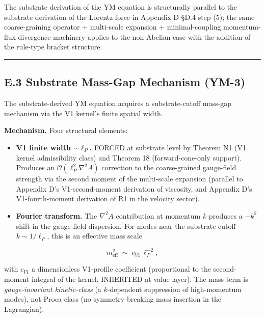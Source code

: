 \documentclass[
  11pt,a4paper]{article}
\providecommand{\tightlist}{%
  \setlength{\itemsep}{0pt}\setlength{\parskip}{0pt}}
\begin{document}
The substrate derivation of the YM equation is structurally parallel to
the substrate derivation of the Lorentz force in Appendix D §D.4 step
(5); the same coarse-graining operator + multi-scale expansion +
minimal-coupling momentum-flux divergence machinery applies to the
non-Abelian case with the addition of the rule-type bracket structure.

\begin{center}\rule{0.5\linewidth}{0.5pt}\end{center}

\subsection{E.3 Substrate Mass-Gap Mechanism
(YM-3)}\label{e.3-substrate-mass-gap-mechanism-ym-3}

The substrate-derived YM equation acquires a substrate-cutoff mass-gap
mechanism via the V1 kernel's finite spatial width.

\textbf{Mechanism.} Four structural elements:

\begin{itemize}
\tightlist
\item
  \textbf{V1 finite width \(\sim \ell_P\).} FORCED at substrate level by
  Theorem N1 (V1 kernel admissibility class) and Theorem 18
  (forward-cone-only support). Produces an
  \(\mathcal{O}(\ell_P^2\nabla^2 A)\) correction to the coarse-grained
  gauge-field strength via the second moment of the multi-scale
  expansion (parallel to Appendix D's V1-second-moment derivation of
  viscosity, and Appendix D's V1-fourth-moment derivation of R1 in the
  velocity sector).
\item
  \textbf{Fourier transform.} The \(\nabla^2 A\) contribution at
  momentum \(k\) produces a \(-k^2\) shift in the gauge-field
  dispersion. For modes near the substrate cutoff \(k \sim 1/\ell_P\),
  this is an effective mass scale
\end{itemize}

\[m_\mathrm{eff}^2 \;\sim\; c_{V1}\,\ell_P^{-2},\]

with \(c_{V1}\) a dimensionless V1-profile coefficient (proportional to
the second-moment integral of the kernel, INHERITED at value layer). The
mass term is \emph{gauge-invariant kinetic-class} (a \(k\)-dependent
suppression of high-momentum modes), not Proca-class (no
symmetry-breaking mass insertion in the Lagrangian).
\end{document}
